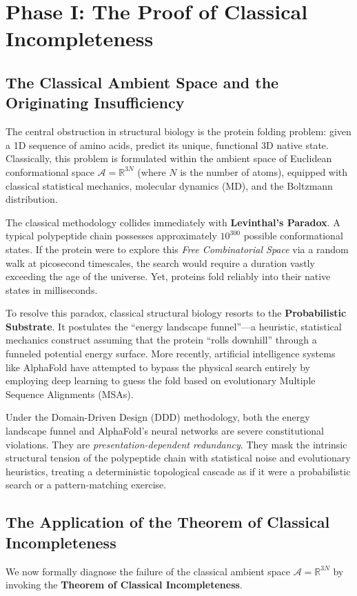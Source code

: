 \documentclass[11pt,openany]{extbook}
\theoremstyle{plain}
\theoremstyle{definition}
\begin{document}
\section{Phase I: The Proof of Classical Incompleteness}

\subsection{The Classical Ambient Space and the Originating Insufficiency}
The central obstruction in structural biology is the protein folding problem: given a 1D sequence of amino acids, predict its unique, functional 3D native state. Classically, this problem is formulated within the ambient space of Euclidean conformational space $\mathcal{A} = \mathbb{R}^{3N}$ (where $N$ is the number of atoms), equipped with classical statistical mechanics, molecular dynamics (MD), and the Boltzmann distribution.

The classical methodology collides immediately with \textbf{Levinthal's Paradox}. A typical polypeptide chain possesses approximately $10^{300}$ possible conformational states. If the protein were to explore this \textit{Free Combinatorial Space} via a random walk at picosecond timescales, the search would require a duration vastly exceeding the age of the universe. Yet, proteins fold reliably into their native states in milliseconds.

To resolve this paradox, classical structural biology resorts to the \textbf{Probabilistic Substrate}. It postulates the ``energy landscape funnel''---a heuristic, statistical mechanics construct assuming that the protein ``rolls downhill'' through a funneled potential energy surface. More recently, artificial intelligence systems like AlphaFold have attempted to bypass the physical search entirely by employing deep learning to guess the fold based on evolutionary Multiple Sequence Alignments (MSAs).

Under the Domain-Driven Design (DDD) methodology, both the energy landscape funnel and AlphaFold's neural networks are severe constitutional violations. They are \textit{presentation-dependent redundancy}. They mask the intrinsic structural tension of the polypeptide chain with statistical noise and evolutionary heuristics, treating a deterministic topological cascade as if it were a probabilistic search or a pattern-matching exercise.

\subsection{The Application of the Theorem of Classical Incompleteness}
We now formally diagnose the failure of the classical ambient space $\mathcal{A} = \mathbb{R}^{3N}$ by invoking the \textbf{Theorem of Classical Incompleteness}.
\end{document}
